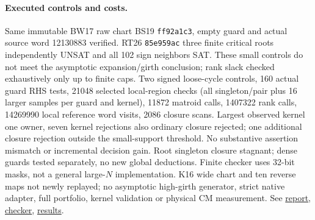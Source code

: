 \documentclass[11pt]{article}
\begin{document}
\paragraph{Executed controls and costs.}
Same immutable BW17 raw chart BS19 \texttt{ff92a1c3}, empty guard and actual source word 12130883 verified. RT26 \texttt{85e959ac} three finite critical roots independently UNSAT and all 102 sign neighbors SAT. These small controls do not meet the asymptotic expansion/girth conclusion; rank slack checked exhaustively only up to finite caps. Two signed loose-cycle controls, 160 actual guard RHS tests, 21048 selected local-region checks (all singleton/pair plus 16 larger samples per guard and kernel), 11872 matroid calls, 1407322 rank calls, 14269990 local reference word visits, 2086 closure scans. Largest observed kernel one owner, seven kernel rejections also ordinary closure rejected; one additional closure rejection outside the small-support threshold. No substantive assertion mismatch or incremental decision gain. Root singleton closure stagnant; dense guards tested separately, no new global deductions. Finite checker uses 32-bit masks, not a general large-$N$ implementation. K16 wide chart and ten reverse maps not newly replayed; no asymptotic high-girth generator, strict native adapter, full portfolio, kernel validation or physical CM measurement. See \href{https://github.com/j15marti/pnp/commit/2c2a5d8cb6881efcbfb0cf5cac165417677027b1}{report}, \href{https://github.com/j15marti/pnp/commit/8145455529812bb156a326e736ab35eeee35e655}{checker}, \href{https://github.com/j15marti/pnp/commit/b82fe532bd57bcb7caaca1f47800cba9d7af5d1e}{results}.
\end{document}
